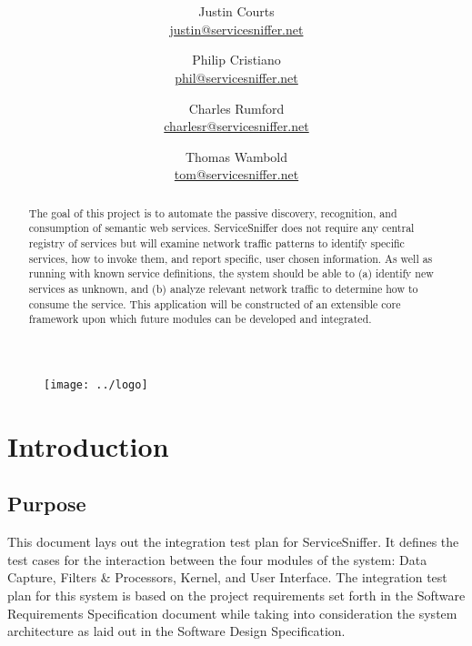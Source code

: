 \documentclass[titlepage]{article}
\title{\textbf{\mytitle}}
\author{
    Justin Courts \\\url{justin@servicesniffer.net}
    \and Philip Cristiano \\\url{phil@servicesniffer.net}
    \and Charles Rumford \\\url{charlesr@servicesniffer.net}
    \and Thomas Wambold \\\url{tom@servicesniffer.net}
}
\date{\mydate}
\begin{document}

\begin{figure}
    \vspace{-6em}
    \centering
    \texttt{[image: ../logo]}
    \vspace{-4em}
\end{figure}

\maketitle

\begin{abstract}
The goal of this project is to automate the passive discovery, recognition,
and consumption of semantic web services.  ServiceSniffer does not require any
central registry of services but will examine network traffic patterns to
identify specific services, how to invoke them, and report specific, user
chosen information.  As well as running with known service definitions, the
system should be able to (a) identify new services as unknown, and (b) analyze
relevant network traffic to determine how to consume the service.  This
application will be constructed of an extensible core framework upon which
future modules can be developed and integrated.
\end{abstract}

\pagebreak

\begin{versionhistory}
\end{versionhistory}

\pagebreak

\setcounter{tocdepth}{4}
\tableofcontents
\pagebreak
{}


\section{Introduction}


\subsection{Purpose}
This document lays out the integration test plan for ServiceSniffer.  It
defines the test cases for the interaction between the four modules of the
system: Data Capture, Filters \& Processors, Kernel, and User Interface.  The
integration test plan for this system is based on the project requirements set
forth in the Software Requirements Specification document while taking into
consideration the system architecture as laid out in the Software Design
Specification.
\end{document}
